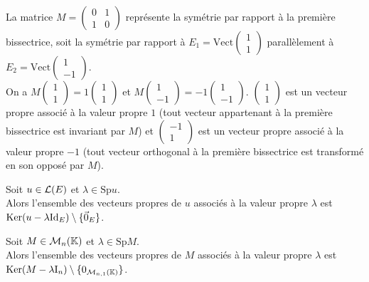 \documentclass[a4paper]{book}
\begin{document}
\begin{Exemple} La matrice $M=\begin{pmatrix}0&1\\1&0\end{pmatrix}$ représente la symétrie par rapport à la première bissectrice, soit la symétrie par rapport à $E_1=\mathrm{Vect}\begin{pmatrix}
1\\1
\end{pmatrix}$ parallèlement à $E_2=\mathrm{Vect}\begin{pmatrix}1\\-1
\end{pmatrix}$.\\
On a $M\begin{pmatrix}1\\1\end{pmatrix}=1\begin{pmatrix}1\\1\end{pmatrix}$  et $M\begin{pmatrix}1\\-1\end{pmatrix}=-1\begin{pmatrix}1\\-1\end{pmatrix}$.
$\begin{pmatrix}1\\1\end{pmatrix}$ est un vecteur propre associé à la valeur propre $1$ (tout vecteur appartenant à la première bissectrice est invariant par $M$) et $\begin{pmatrix}-1\\1\end{pmatrix}$ est un vecteur propre associé à la valeur propre $-1$ (tout vecteur orthogonal à la première bissectrice est transformé en son opposé par $M$).
\end{Exemple}
\begin{Proposition}
Soit $u\in \mathcal{L}(E)$ et $\lambda    \in \mathrm{Sp} u$.\\
Alors l'ensemble des vecteurs propres de $u$ associés à la valeur propre $\lambda    $ est $\operatorname{Ker}(u-\lambda    \mathrm{Id}_E)\setminus\{ \vec{0}_{E}\} $.
\end{Proposition}
\begin{Proposition}
Soit $M\in \mathcal{M}_{n}(\mathbb{K})$ et $\lambda    \in \mathrm{Sp} M$.\\
Alors l'ensemble des vecteurs propres de $M$ associés à la valeur propre $\lambda    $ est $\operatorname{Ker}(M-\lambda    \mathrm{I}_n) \setminus \{0_{\mathcal{M}_{n,1}(\mathbb{K})}\}$.
\end{Proposition}
\end{document}

